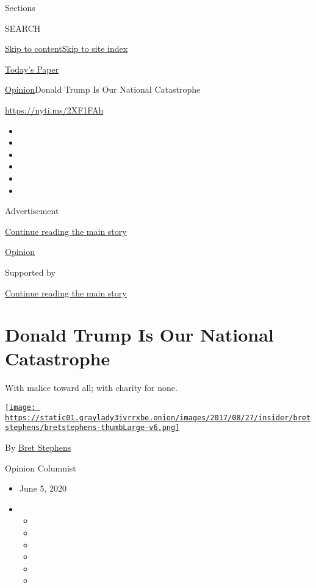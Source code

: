 Sections

SEARCH

\protect\hyperlink{site-content}{Skip to
content}\protect\hyperlink{site-index}{Skip to site index}

\href{https://myaccount.nytimes3xbfgragh.onion/auth/login?response_type=cookie\&client_id=vi}{}

\href{https://www.nytimes3xbfgragh.onion/section/todayspaper}{Today's
Paper}

\href{/section/opinion}{Opinion}\textbar{}Donald Trump Is Our National
Catastrophe

\url{https://nyti.ms/2XF1FAh}

\begin{itemize}
\item
\item
\item
\item
\item
\item
\end{itemize}

Advertisement

\protect\hyperlink{after-top}{Continue reading the main story}

\href{/section/opinion}{Opinion}

Supported by

\protect\hyperlink{after-sponsor}{Continue reading the main story}

\hypertarget{donald-trump-is-our-national-catastrophe}{%
\section{Donald Trump Is Our National
Catastrophe}\label{donald-trump-is-our-national-catastrophe}}

With malice toward all; with charity for none.

\href{https://www.nytimes3xbfgragh.onion/by/bret-stephens}{\texttt{[image: https://static01.graylady3jvrrxbe.onion/images/2017/08/27/insider/bretstephens/bretstephens-thumbLarge-v6.png]}}

By \href{https://www.nytimes3xbfgragh.onion/by/bret-stephens}{Bret
Stephens}

Opinion Columnist

\begin{itemize}
\item
  June 5, 2020
\item
  \begin{itemize}
  \item
  \item
  \item
  \item
  \item
  \item
  \end{itemize}
\end{itemize}

